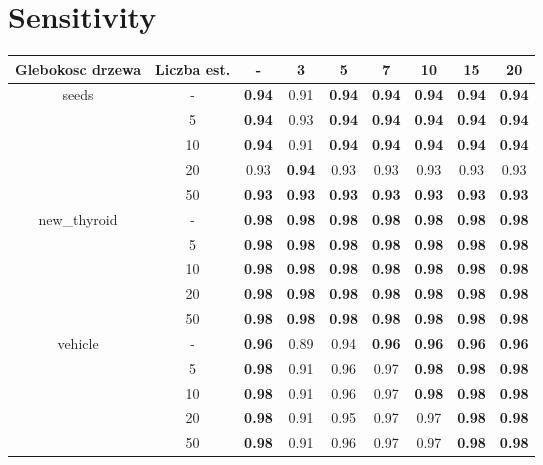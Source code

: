 \documentclass{article}%
\begin{document}
\section*{Sensitivity}%
\begin{tabular}{c|c|ccccccc}%
\hline%
Glebokosc drzewa&Liczba est.&{-}&3&5&7&10&15&20\\%
\hline%
\multirow{5}{*}{seeds}&{-}&\textbf{0.94}&0.91&\textbf{0.94}&\textbf{0.94}&\textbf{0.94}&\textbf{0.94}&\textbf{0.94}\\%
\cline{2%
-%
9}%
&5&\textbf{0.94}&0.93&\textbf{0.94}&\textbf{0.94}&\textbf{0.94}&\textbf{0.94}&\textbf{0.94}\\%
\cline{2%
-%
9}%
&10&\textbf{0.94}&0.91&\textbf{0.94}&\textbf{0.94}&\textbf{0.94}&\textbf{0.94}&\textbf{0.94}\\%
\cline{2%
-%
9}%
&20&0.93&\textbf{0.94}&0.93&0.93&0.93&0.93&0.93\\%
\cline{2%
-%
9}%
&50&\textbf{0.93}&\textbf{0.93}&\textbf{0.93}&\textbf{0.93}&\textbf{0.93}&\textbf{0.93}&\textbf{0.93}\\%
\hline%
\multirow{5}{*}{new\_thyroid}&{-}&\textbf{0.98}&\textbf{0.98}&\textbf{0.98}&\textbf{0.98}&\textbf{0.98}&\textbf{0.98}&\textbf{0.98}\\%
\cline{2%
-%
9}%
&5&\textbf{0.98}&\textbf{0.98}&\textbf{0.98}&\textbf{0.98}&\textbf{0.98}&\textbf{0.98}&\textbf{0.98}\\%
\cline{2%
-%
9}%
&10&\textbf{0.98}&\textbf{0.98}&\textbf{0.98}&\textbf{0.98}&\textbf{0.98}&\textbf{0.98}&\textbf{0.98}\\%
\cline{2%
-%
9}%
&20&\textbf{0.98}&\textbf{0.98}&\textbf{0.98}&\textbf{0.98}&\textbf{0.98}&\textbf{0.98}&\textbf{0.98}\\%
\cline{2%
-%
9}%
&50&\textbf{0.98}&\textbf{0.98}&\textbf{0.98}&\textbf{0.98}&\textbf{0.98}&\textbf{0.98}&\textbf{0.98}\\%
\hline%
\multirow{5}{*}{vehicle}&{-}&\textbf{0.96}&0.89&0.94&\textbf{0.96}&\textbf{0.96}&\textbf{0.96}&\textbf{0.96}\\%
\cline{2%
-%
9}%
&5&\textbf{0.98}&0.91&0.96&0.97&\textbf{0.98}&\textbf{0.98}&\textbf{0.98}\\%
\cline{2%
-%
9}%
&10&\textbf{0.98}&0.91&0.96&0.97&\textbf{0.98}&\textbf{0.98}&\textbf{0.98}\\%
\cline{2%
-%
9}%
&20&\textbf{0.98}&0.91&0.95&0.97&0.97&\textbf{0.98}&\textbf{0.98}\\%
\cline{2%
-%
9}%
&50&\textbf{0.98}&0.91&0.96&0.97&0.97&\textbf{0.98}&\textbf{0.98}\\%

\end{tabular}
\end{document}
